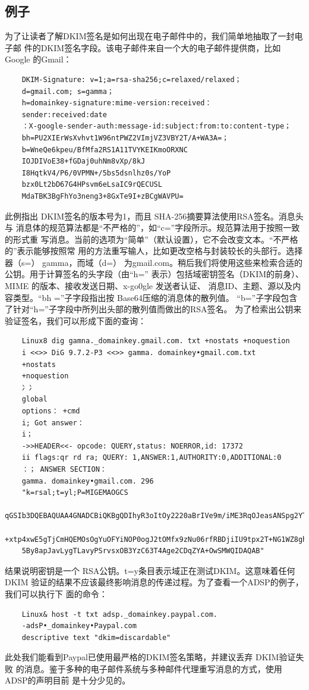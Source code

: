 \subsection{例子}
为了让读者了解DKIM签名是如何出现在电子邮件中的，我们简单地抽取了一封电子邮
件的DKIM签名字段。该电子邮件来自一个大的电子邮件提供商，比如 Google 的Gmail：
\begin{verbatim}
    DKIM-Signature: v=1;a=rsa-sha256;c=relaxed/relaxed；
    d=gmail.com; s=gamma；
    h=domainkey-signature:mime-version:received：
    sender:received:date
    ：X-google-sender-auth:message-id:subject:from:to:content-type；
    bh=PU2XIErWsXvhvt1W96ntPWZ2VImjVZ3VBY2T/A+WA3A=；
    b=WneQe6kpeu/BfMfa2RS1A11TVYKEIKmoORXNC
    IOJDIVoE38+fGDaj0uhNm8vXp/8kJ
    I8HqtkV4/P6/0VPMN+/5bs5dsnlhz0s/YoP
    bzx0Lt2bD67G4HPsvm6eLsaIC9rQECUSL
    MdaTBK3BgFhYo3neng3+8GxTe9I+zBCgWAVPU=
\end{verbatim}
此例指出 DKIM签名的版本号为1，而且 SHA-256摘要算法使用RSA签名。消息头与
消息体的规范算法都是“不严格的”，如“c=”字段所示。规范算法用于按照一致的形式重
写消息。当前的选项为“简单”（默认设置），它不会改变文本。“不严格的”表示能够按照常
用的方法重写输人，比如更改空格与封装较长的头部行。选择器（s=） gamma，而域（d=）
为gmail.com。稍后我们将使用这些来检索合适的公钥。用于计算签名的头字段（由“h=”
表示）包括域密钥签名（DKIM的前身）、MIME 的版本、接收发送日期、x-go0gle 发送者认证、
消息ID、主题、源以及内容类型。“bh =”子字段指出按 Base64压缩的消息体的散列值。
“b=”子字段包含了针对“h=”子字段中所列出头部的散列值而做出的RSA签名。
为了检索出公钥来验证签名，我们可以形成下面的查询：
\begin{verbatim}
    Linux8 dig gamna._domainkey.gmail.com. txt +nostats +noquestion
    i <<>> DiG 9.7.2-P3 <<>> gamma. domainkey•gmail.com.txt
    +nostats
    +noquestion
    冫冫
    global
    options： +cmd
    i; Got answer：
    i；
    ->>HEADER<<- opcode: QUERY,status: NOERROR,id: 17372
    ii flags:qr rd ra; QUERY: 1,ANSWER:1,AUTHORITY:0,ADDITIONAL:0
    ：； ANSWER SECTION：
    gamma. domainkey•gmail.com. 296
    "k=rsal;t=yl;P=MIGEMAOGCS
    qGSIb3DQEBAQUAA4GNADCBiQKBgQDIhyR3oItOy2220aBrIVe9m/iME3RqOJeasANSpg2YTHTYV
    +xtp4xwE5gTjCmHQEMOsOgYuOFYiNOP0ogJ2tOMfx9zNu06rfRBDjiIU9tpx2T+NG1WZ8ghbiLo
    5By8apJavLygTLavyPSrvsxOB3YzC63T4Age2CDqZYA+OwSMWQIDAQAB"
\end{verbatim}
结果说明密钥是一个 RSA公钥。t=y条目表示域正在测试DKIM。这意味着任何 DKIM
验证的结果不应该最终影响消息的传递过程。为了查看一个ADSP的例子，我们可以执行下
面的命令：
\begin{verbatim}
    Linux& host -t txt adsp._domainkey.paypal.com.
    -adsP•_domainkey•Paypal.com
    descriptive text "dkim=discardable"
\end{verbatim}
此处我们能看到Paypal已使用最严格的DKIM签名策略，并建议丢弃 DKIM验证失败
的消息。鉴于多种的电子邮件系统与多种邮件代理重写消息的方式，使用ADSP的声明目前
是十分少见的。

